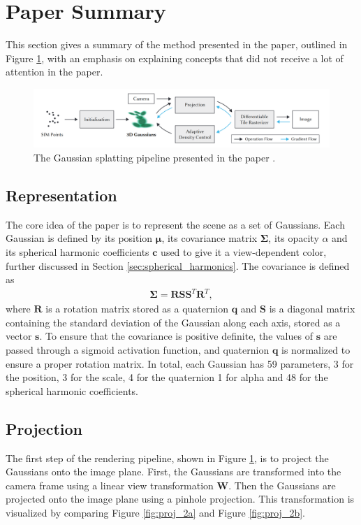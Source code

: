 

\section{Paper Summary}
This section gives a summary of the method presented in the paper, outlined in Figure \ref{fig:pipeline},
with an emphasis on explaining concepts that did not receive a lot of attention in the paper.

\begin{figure}
    \centering
    \includegraphics[width=\textwidth]{images/pipeline.png}
    \caption{The Gaussian splatting pipeline presented in the paper \cite[Fig. 2]{kerbl3DGaussianSplatting2023}.}
    \label{fig:pipeline}
\end{figure}


\subsection{Representation}
The core idea of the paper is to represent the scene as a set of Gaussians.
Each Gaussian is defined by its position $\bm{\mu}$, its covariance matrix $\bm{\Sigma}$, its opacity $\alpha$ and its spherical harmonic coefficients $\bm{c}$ used to give it a view-dependent color, further discussed in Section \ref{sec:spherical_harmonics}.
The covariance is defined as
\begin{align}
    \bm{\Sigma} = \bm{R} \bm{S} \bm{S}^T \bm{R}^T,
\end{align}
where $\bm{R}$ is a rotation matrix stored as a quaternion $\bm{q}$ and $\bm{S}$ is a diagonal matrix containing the standard deviation of the Gaussian along each axis, stored as a vector $\bm{s}$.
To ensure that the covariance is positive definite, the values of $\bm{s}$ are passed through a sigmoid activation function, and quaternion $\bm{q}$ is normalized to ensure a proper rotation matrix.
In total, each Gaussian has 59 parameters, 3 for the position, 3 for the scale, 4 for the quaternion 1 for alpha and 48 for the spherical harmonic coefficients.


\subsection{Projection}
The first step of the rendering pipeline, shown in Figure \ref{fig:pipeline}, is to project the Gaussians onto the image plane.
First, the Gaussians are transformed into the camera frame using a linear view transformation $\bm{W}$.
Then the Gaussians are projected onto the image plane using a pinhole projection.
This transformation is visualized by comparing Figure \ref{fig:proj_2a} and Figure \ref{fig:proj_2b}.


